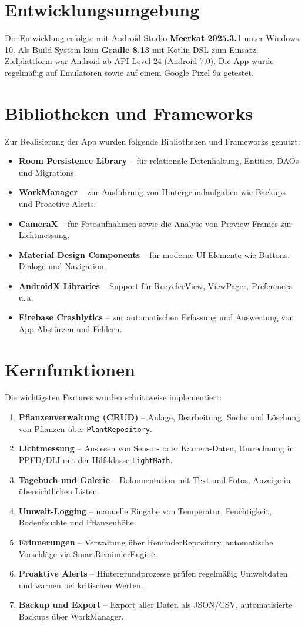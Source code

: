 \documentclass[14pt,a4paper]{report}
\begin{document}
\section{Entwicklungsumgebung}
Die Entwicklung erfolgte mit Android Studio \textbf{Meerkat 2025.3.1} unter Windows 10. 
Als Build-System kam \textbf{Gradle 8.13} mit Kotlin DSL zum Einsatz. 
Zielplattform war Android ab API Level 24 (Android 7.0). 
Die App wurde regelmäßig auf Emulatoren sowie auf einem Google Pixel 9a getestet.

\section{Bibliotheken und Frameworks}
Zur Realisierung der App wurden folgende Bibliotheken und Frameworks genutzt:
\begin{itemize}
    \item \textbf{Room Persistence Library} – für relationale Datenhaltung, Entities, DAOs und Migrations.
    \item \textbf{WorkManager} – zur Ausführung von Hintergrundaufgaben wie Backups und Proactive Alerts.
    \item \textbf{CameraX} – für Fotoaufnahmen sowie die Analyse von Preview-Frames zur Lichtmessung.
    \item \textbf{Material Design Components} – für moderne UI-Elemente wie Buttons, Dialoge und Navigation.
    \item \textbf{AndroidX Libraries} – Support für RecyclerView, ViewPager, Preferences u.\,a.
    \item \textbf{Firebase Crashlytics} – zur automatischen Erfassung und Auswertung von App-Abstürzen und Fehlern.
\end{itemize}

\section{Kernfunktionen}
Die wichtigsten Features wurden schrittweise implementiert:
\begin{enumerate}
    \item \textbf{Pflanzenverwaltung (CRUD)} – Anlage, Bearbeitung, Suche und Löschung von Pflanzen über \texttt{PlantRepository}.
    \item \textbf{Lichtmessung} – Auslesen von Sensor- oder Kamera-Daten, Umrechnung in PPFD/DLI mit der Hilfsklasse \texttt{LightMath}.
    \item \textbf{Tagebuch und Galerie} – Dokumentation mit Text und Fotos, Anzeige in übersichtlichen Listen.
    \item \textbf{Umwelt-Logging} – manuelle Eingabe von Temperatur, Feuchtigkeit, Bodenfeuchte und Pflanzenhöhe.
    \item \textbf{Erinnerungen} – Verwaltung über ReminderRepository, automatische Vorschläge via SmartReminderEngine.
    \item \textbf{Proaktive Alerts} – Hintergrundprozesse prüfen regelmäßig Umweltdaten und warnen bei kritischen Werten.
    \item \textbf{Backup und Export} – Export aller Daten als JSON/CSV, automatisierte Backups über WorkManager.
\end{enumerate}
\end{document}

